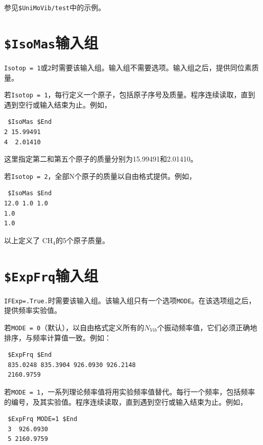 \documentclass[12pt,a4paper,openany,twoside,cap]{ctexbook}
\begin{document}
参见\verb|$UniMoVib/test|中的示例。

\section{\texttt{\$IsoMas}输入组} \label{sec:inp-isomas}

\verb|Isotop = 1|或\verb|2|时需要该输入组。输入组不需要选项。输入组之后，提供同位素质量。

\bigskip{}
若\verb|Isotop = 1|，每行定义一个原子，包括原子序号及质量。程序连续读取，直到遇到空行或输入结束为止。例如，
\begin{colorboxed}[oval=false,boxcolor=green!75!black,bgcolor=green!5!white]
\ttfamily
\begin{lstlisting}
 $IsoMas $End
2 15.99491
4  2.01410
\end{lstlisting}\end{colorboxed}
这里指定第二和第五个原子的质量分别为15.99491和2.01410。

\bigskip{}
若\verb|Isotop = 2|，全部N个原子的质量以自由格式提供。例如，
\begin{colorboxed}[oval=false,boxcolor=green!75!black,bgcolor=green!5!white]
\ttfamily
\begin{lstlisting}
 $IsoMas $End
12.0 1.0 1.0
1.0
1.0
\end{lstlisting}\end{colorboxed}
以上定义了 CH$_4$的5个原子质量。

\section{\texttt{\$ExpFrq}输入组} \label{sec:inp-expfrq}

\verb|IFExp=.True.|时需要该输入组。该输入组只有一个选项\verb|MODE|。在该选项组之后，提供频率实验值。

\bigskip{}
若\verb|MODE = 0|（默认），以自由格式定义所有的$N_{Vib}$个振动频率值，它们必须正确地排序，与频率计算值一致。例如：
\begin{colorboxed}[oval=false,boxcolor=green!75!black,bgcolor=green!5!white]
\ttfamily
\begin{lstlisting}
 $ExpFrq $End
 835.0248 835.3904 926.0930 926.2148
 2160.9759
\end{lstlisting}\end{colorboxed}


若\verb|MODE = 1|，一系列理论频率值将用实验频率值替代。每行一个频率，包括频率的编号，及其实验值。程序连续读取，直到遇到空行或输入结束为止。例如，
\begin{colorboxed}[oval=false,boxcolor=green!75!black,bgcolor=green!5!white]
\ttfamily
\begin{lstlisting}
 $ExpFrq MODE=1 $End
 3  926.0930
 5 2160.9759
\end{lstlisting}\end{colorboxed}
\end{document}
